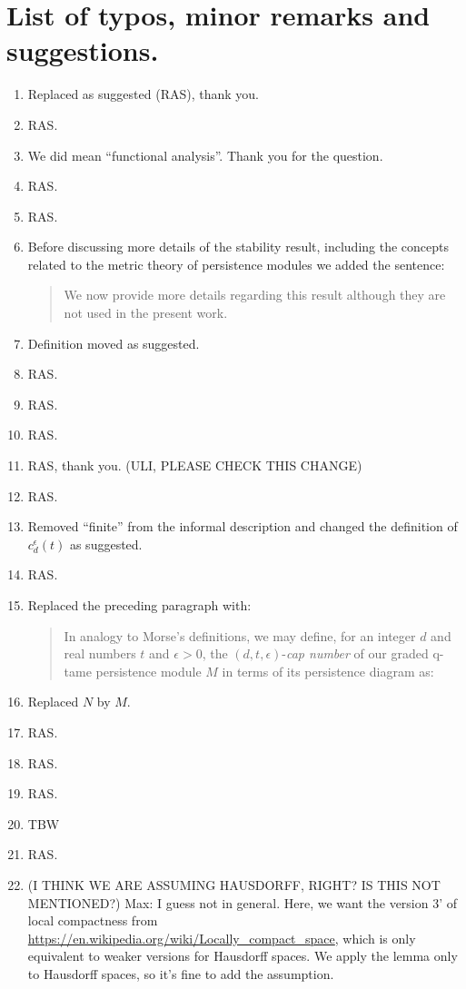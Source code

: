 \documentclass{article}
\begin{document}
	\section{List of typos, minor remarks and suggestions.}
	\begin{enumerate}
		\item Replaced as suggested (RAS), thank you.
		\item RAS.
		\item We did mean ``functional analysis''. Thank you for the question.
		\item RAS.
		\item RAS.
		\item Before discussing more details of the stability result, including the concepts related to the metric theory of persistence modules we added the sentence:
		\begin{quote}
			We now provide more details regarding this result although they are not used in the present work.
		\end{quote}
		\item Definition moved as suggested.
		\item RAS.
		\item RAS.
		\item RAS.
		\item RAS, thank you. (ULI, PLEASE CHECK THIS CHANGE)
		\item RAS.
		\item Removed ``finite'' from the informal description and changed the definition of $c_d^{\epsilon}(t)$ as suggested.
		\item RAS.
		\item Replaced the preceding paragraph with:
		\begin{quote}
			In analogy to Morse's definitions, we may define, for an integer $d$ and real numbers $t$ and $\epsilon > 0$, the $(d, t, \epsilon)$-\emph{cap number} of our graded q-tame persistence module $M$ in terms of its persistence diagram as:
		\end{quote}
		\item Replaced $N$ by $M$.
		\item RAS.
		\item RAS.
		\item RAS.
		\item TBW
		\item RAS.
		\item (I THINK WE ARE ASSUMING HAUSDORFF, RIGHT? IS THIS NOT MENTIONED?)
		Max: I guess not in general. Here, we want the version 3' of local compactness from \url{https://en.wikipedia.org/wiki/Locally_compact_space}, which is only equivalent to weaker versions for Hausdorff spaces. We apply the lemma only to Hausdorff spaces, so it's fine to add the assumption.
		

\end{enumerate}
\end{document}
